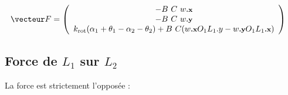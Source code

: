 \documentclass[a4paper,10pt]{article}
\newcommand{\px}{{\text{\footnotesize\textbf{.x}}}}
\newcommand{\py}{{\text{\footnotesize\textbf{.y}}}}
\newcommand{\krot}{\ensuremath{k_{\text{rot}}}}
\begin{document}
    \begin{align*}
        \vecteur F &= \left(\begin{array}{c}
                                -B\ C\ w\px
                                \\
                                -B\ C\ w\py
                                \\
                                \krot (\alpha_1+\theta_1-\alpha_2-\theta_2)+B\ C(w\px O_1L_1.y-w\py O_1L_1\px)
                            \end{array}\right)
    \end{align*}



    
    
    
    
    
    \subsection{Force de $L_1$ sur $L_2$}

        La force est strictement l'opposée :
        
\end{document}

